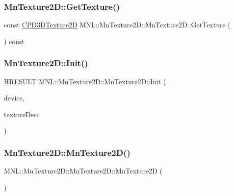 \subsubsection{\texorpdfstring{Mn\+Texture2\+D\+::\+Get\+Texture()}{MnTexture2D::GetTexture()}}
{\footnotesize\ttfamily const \hyperlink{namespace_m_n_l_addb538e1cbd1f443e6db5e6312487c51}{C\+P\+D3\+D\+Texture2D} M\+N\+L\+::\+Mn\+Texture2\+D\+::\+Mn\+Texture2\+D\+::\+Get\+Texture (\begin{DoxyParamCaption}{ }\end{DoxyParamCaption}) const}

\mbox{\label{class_m_n_l_1_1_mn_texture2_d_a34ca4a63ce6c64977c71ab9929827d18}} 
\subsubsection{\texorpdfstring{Mn\+Texture2\+D\+::\+Init()}{MnTexture2D::Init()}}
{\footnotesize\ttfamily H\+R\+E\+S\+U\+LT M\+N\+L\+::\+Mn\+Texture2\+D\+::\+Mn\+Texture2\+D\+::\+Init (\begin{DoxyParamCaption}\item[{const \hyperlink{namespace_m_n_l_a1eec210db8f309a4a9ac0d9658784c31}{C\+P\+D3\+D\+Device}}]{device,  }\item[{const D3\+D11\+\_\+\+T\+E\+X\+T\+U\+R\+E2\+D\+\_\+\+D\+E\+SC \&}]{texture\+Desc }\end{DoxyParamCaption})}

\mbox{\label{class_m_n_l_1_1_mn_texture2_d_a487782964ae4c1971e71fed3b637abf5}} 
\subsubsection{\texorpdfstring{Mn\+Texture2\+D\+::\+Mn\+Texture2\+D()}{MnTexture2D::MnTexture2D()}}
{\footnotesize\ttfamily M\+N\+L\+::\+Mn\+Texture2\+D\+::\+Mn\+Texture2\+D\+::\+Mn\+Texture2D (\begin{DoxyParamCaption}{ }\end{DoxyParamCaption})}



